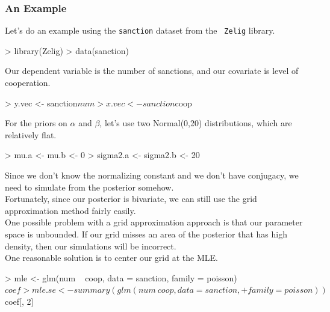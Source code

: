 \documentclass[handout]{beamer}
\begin{document}
\begin{frame}[fragile]
\frametitle{An Example}
\pause
Let's do an example using the {\tt sanction} dataset from the {\tt
Zelig} library.
\pause
\tiny
\begin{Schunk}
\begin{Sinput}
> library(Zelig)
> data(sanction)
\end{Sinput}
\end{Schunk}
\bigskip
\pause
\normalsize
Our dependent variable is the number of sanctions, and our covariate
is level of cooperation.
\pause
\tiny
\begin{Schunk}
\begin{Sinput}
> y.vec <- sanction$num
> x.vec <- sanction$coop
\end{Sinput}
\end{Schunk}
\normalsize
\bigskip
\pause
For the priors on $\alpha$ and $\beta$, let's use two Normal(0,20)
distributions, which are relatively flat.
\tiny
\pause
\begin{Schunk}
\begin{Sinput}
> mu.a <- mu.b <- 0
> sigma2.a <- sigma2.b <- 20
\end{Sinput}
\end{Schunk}
\end{frame}

\begin{frame}[fragile]
Since we don't know the normalizing constant and we don't have
conjugacy, we need to simulate from the posterior somehow.  \\
\pause
\bigskip
Fortunately, since our posterior is bivariate, we can still use the
grid approximation method fairly easily. \\
\pause
\bigskip
One possible problem with a grid approximation approach is that our
parameter space is unbounded.  \pause If our grid misses an area of the
posterior that has high density, then our simulations will be incorrect.\\ 
\pause
\bigskip
One reasonable solution is to center our grid at the MLE.
\pause
\bigskip
\pause
\tiny
\begin{Schunk}
\begin{Sinput}
> mle <- glm(num ~ coop, data = sanction, family = poisson)$coef
> mle.se <- summary(glm(num ~ coop, data = sanction, 
+     family = poisson))$coef[, 2]
\end{Sinput}
\end{Schunk}
\end{frame}
\end{document}
